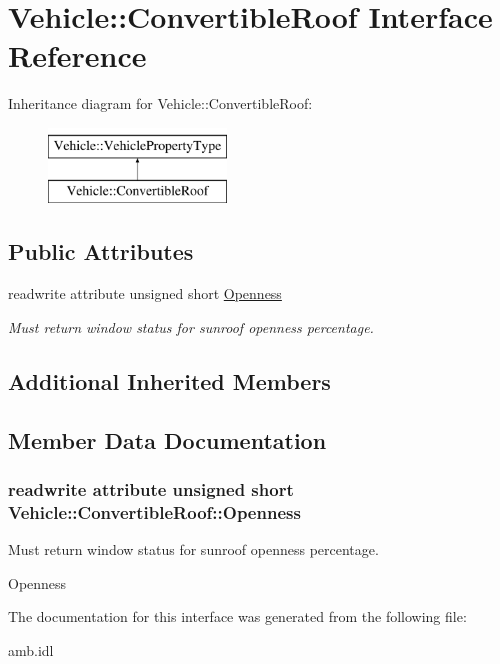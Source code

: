 \hypertarget{interfaceVehicle_1_1ConvertibleRoof}{\section{Vehicle\-:\-:Convertible\-Roof Interface Reference}
\label{interfaceVehicle_1_1ConvertibleRoof}
}
Inheritance diagram for Vehicle\-:\-:Convertible\-Roof\-:\begin{figure}[H]
\begin{center}
\leavevmode
\includegraphics[height=2.000000cm]{interfaceVehicle_1_1ConvertibleRoof}
\end{center}
\end{figure}
\subsection*{Public Attributes}
\begin{DoxyCompactItemize}
\item 
readwrite attribute unsigned short \hyperlink{interfaceVehicle_1_1ConvertibleRoof_a0e90bfa46bed048e4ad50293c619e3b3}{Openness}
\begin{DoxyCompactList}\small\item\em Must return window status for sunroof openness percentage. \end{DoxyCompactList}\end{DoxyCompactItemize}
\subsection*{Additional Inherited Members}


\subsection{Member Data Documentation}
\hypertarget{interfaceVehicle_1_1ConvertibleRoof_a0e90bfa46bed048e4ad50293c619e3b3}{
\subsubsection[{Openness}]{\setlength{\rightskip}{0pt plus 5cm}readwrite attribute unsigned short Vehicle\-::\-Convertible\-Roof\-::\-Openness}}\label{interfaceVehicle_1_1ConvertibleRoof_a0e90bfa46bed048e4ad50293c619e3b3}


Must return window status for sunroof openness percentage. 

Openness 

The documentation for this interface was generated from the following file\-:\begin{DoxyCompactItemize}
\item 
amb.\-idl\end{DoxyCompactItemize}

